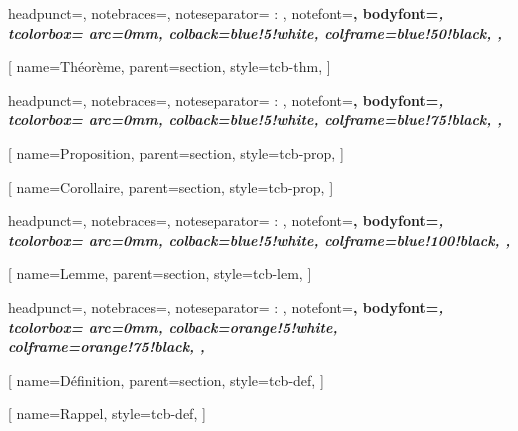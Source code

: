 \renewcommand*{\proofname}{Démonstration}

\theoremstyle{definition}
\newtheorem*{nota}{Notation}

\theoremstyle{definition}
\newtheorem*{algo}{Algorithme}

\theoremstyle{definition}
\newtheorem*{ax}{Axiome}

\theoremstyle{definition}
\newtheorem*{nomen}{Nomenclature}

\theoremstyle{definition}
\newtheorem{ex}{Exemple}[section]

\theoremstyle{remark}
\newtheorem{rmq}{Remarque}[chapter]

\theoremstyle{remark}
\newtheorem{heur}{Heuristique}[chapter]

  {
    headpunct={},
    notebraces={}{},
    noteseparator={ : },
    notefont=\bfseries,
    bodyfont=\slshape,
    tcolorbox={
      arc=0mm,
      colback=blue!5!white,
      colframe=blue!50!black,
      },
  }
  
[
  name=Théorème,
  parent=section,
  style=tcb-thm,
  ]  
  
  {
    headpunct={},
    notebraces={}{},
    noteseparator={ : },
    notefont=\bfseries,
    bodyfont=\slshape,
    tcolorbox={
      arc=0mm,
      colback=blue!5!white,
      colframe=blue!75!black,
      },
  }
 
[
  name=Proposition,
  parent=section,
  style=tcb-prop,
  ] 
  
[
  name=Corollaire,
  parent=section,
  style=tcb-prop,
  ]
  
  {
    headpunct={},
    notebraces={}{},
    noteseparator={ : },
    notefont=\bfseries,
    bodyfont=\slshape,
    tcolorbox={
      arc=0mm,
      colback=blue!5!white,
      colframe=blue!100!black,
      },
  }
  
[
  name=Lemme,
  parent=section,
  style=tcb-lem,
  ]
 
  
  {
    headpunct={},
    notebraces={}{},
    noteseparator={ : },
    notefont=\bfseries,
    bodyfont=\slshape,
    tcolorbox={
      arc=0mm,
      colback=orange!5!white,
      colframe=orange!75!black,
      },
  }
  
[
  name=Définition,
  parent=section,
  style=tcb-def,
  ]
 
[
  name=Rappel,
  style=tcb-def,
  ]
 
